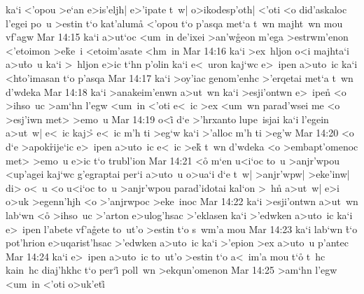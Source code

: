ka`i
<'opou
>e`an
e>is'eljh|
e>'ipate
t~w|
o>ikodesp'oth|
<'oti
<o
did'askaloc
l'egei
po~u
>estin
t`o
kat'alum\r{a}
<'opou
t`o
p'asqa
met`a
t~wn
majht~wn
mou
vf'agw\bibvsend
\vs Mar 14:15
ka`i
a>ut`oc
<um~in
de'ixei
>an'w\r{g}eon
m'ega
>estrwm'enon
<'etoimon
>e\r{k}e~i
<etoim'asate
<hm~in\bibvsend
\vs Mar 14:16
ka`i
>ex~hljon
o<i
majhta`i
a>u\r{t}o~u
ka`i
>~hljon
e>ic
t`hn
p'olin
ka`i
e<~uron
kaj`wc
e>~ipen
a>uto~ic
ka`i
<hto'imasan
t`o
p'asqa\bibvsend
\vs Mar 14:17
ka`i
>oy'iac
genom'enhc
>'erqetai
met`a
t~wn
d'wdeka\bibvsend
\vs Mar 14:18
ka`i
>anakeim'enwn
a>ut~wn
ka`i
>esji'ontwn
e>~ipen\r{}
<o
>ihso~uc
>am`hn
l'egw
<um~in
<'oti
e<~ic
>ex
<um~wn
parad'wsei
me
<o
>esj'iwn
met>
>emo~u\bibvsend
\vs Mar 14:19
o<i\r{}
d`e
>'hrxanto
lupe~isjai
ka`i
l'egein
a>ut~w|
e<~ic
kaj>\r{}
e<~ic
m'h
ti
>eg`w
ka`i
>'alloc
m'h
ti
>eg'w\bibvsend
\vs Mar 14:20
<o
d`e
>apok\r{r}ije`ic
e>~ipen
a>uto~ic
e<~ic
>e\r{k}
t~wn
d'wdeka
<o
>embapt'omenoc
met>
>emo~u
e>ic
t`o
trubl'ion\bibvsend
\vs Mar 14:21
<o\r{}
m`en
u<i`oc
to~u
>anjr'wpou
<up'agei
kaj`wc
g'egraptai
per`i
a>uto~u
o>ua`i
d`e
t~w|
>anjr'wpw|
>eke'inw|
di>
o<~u
<o
u<i`oc
to~u
>anjr'wpou
parad'idotai
kal`on
>~h\r{n}
a>ut~w|
e>i
o>uk
>egenn'hjh
<o
>'anjrwpoc
>eke~inoc\bibvsend
\vs Mar 14:22
ka`i
>esji'ontwn
a>ut~wn
lab`wn
<o\r{}
>ihso~uc
>'arton
e>ulog'hsac
>'eklasen
ka`i
>'edwken
a>uto~ic
ka`i
e>~ipen
l'abete
vf'a\r{g}ete
to~ut'o
>estin
t`o
s~wm'a
mou\bibvsend
\vs Mar 14:23
ka`i
lab`wn
\r{t}`o
pot'hrion
e>uqarist'hsac
>'edwken
a>uto~ic
ka`i
>'epion
>ex
a>uto~u
p'antec\bibvsend
\vs Mar 14:24
ka`i
e>~ipen
a>uto~ic
to~ut'o
>estin
t`o
a<~im'a
mou
t`o\r{}
t~hc
kain~hc
diaj'hkhc
t`o
per`i\r{}
poll~wn
>ekqun'omenon\bibvsend
\vs Mar 14:25
>am`hn
l'egw
<um~in
<'oti
o>uk'eti\r{}
